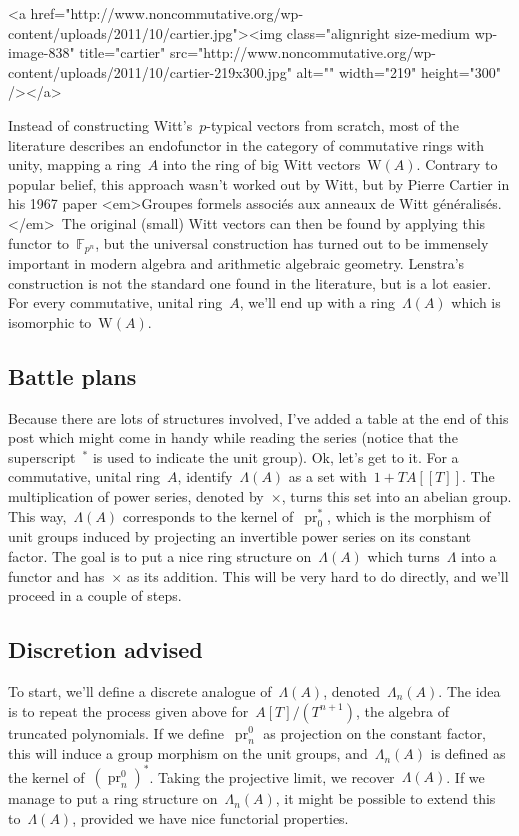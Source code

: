 <a href="http://www.noncommutative.org/wp-content/uploads/2011/10/cartier.jpg"><img class="alignright size-medium wp-image-838" title="cartier" src="http://www.noncommutative.org/wp-content/uploads/2011/10/cartier-219x300.jpg" alt="" width="219" height="300" /></a>

Instead of constructing Witt's~$p$-typical vectors from scratch, most of the literature describes an endofunctor in the category of commutative rings with unity, mapping a ring~$A$ into the ring of big Witt vectors~$\mathrm{W}(A)$. Contrary to popular belief, this approach wasn't worked out by Witt, but by Pierre Cartier in his 1967 paper <em>Groupes formels associés aux anneaux de Witt généralisés.</em> The original (small) Witt vectors can then be found by applying this functor to~$\mathbb{F}_{p^{n}}$, but the universal construction has turned out to be immensely important in modern algebra and arithmetic algebraic geometry. Lenstra's construction is not the standard one found in the literature, but is a lot easier. For every commutative, unital ring~$A$, we'll end up with a ring~$\Lambda(A)$ which is isomorphic to~$\mathrm{W}(A)$.

\subsection{Battle plans}

Because there are lots of structures involved, I've added a table at the end of this post which might come in handy while reading the series (notice that the superscript~$^{*}$ is used to indicate the unit group). Ok, let's get to it. For a commutative, unital ring~$A$, identify~$\Lambda(A)$ as a set with~$1+TA[\![T]\!]$. The multiplication of power series, denoted by~$\times$, turns this set into an abelian group. This way,~$\Lambda(A)$ corresponds to the kernel of~$\operatorname{pr}_{0}^{*}$, which is the morphism of unit groups induced by projecting an invertible power series on its constant factor. The goal is to put a nice ring structure on~$\Lambda(A)$ which turns~$\Lambda$ into a functor and has~$\times$ as its addition. This will be very hard to do directly, and we'll proceed in a couple of steps.

\subsection{Discretion advised}

To start, we'll define a discrete analogue of~$\Lambda(A)$, denoted~$\Lambda_{n}(A)$. The idea is to repeat the process given above for~$A[T]/(T^{n+1})$, the algebra of truncated polynomials. If we define~$\operatorname{pr}_{n}^{0}$ as projection on the constant factor, this will induce a group morphism on the unit groups, and~$\Lambda_{n}(A)$ is defined as the kernel of~$(\operatorname{pr}_{n}^{0})^{*}$. Taking the projective limit, we recover~$\Lambda(A)$. If we manage to put a ring structure on~$\Lambda_{n}(A)$, it might be possible to extend this to~$\Lambda(A)$, provided we have nice functorial properties.

